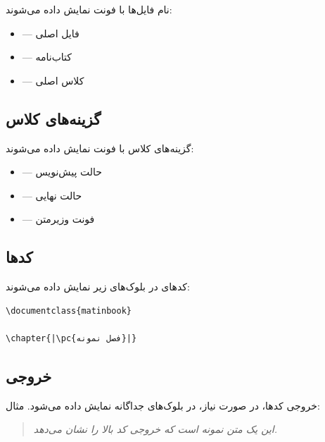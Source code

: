 نام فایل‌ها با فونت  نمایش داده
می‌شوند:

\begin{itemize}
    \item {} — فایل اصلی
    \item {} — کتاب‌نامه
    \item {} — کلاس اصلی
\end{itemize}

\subsection*{گزینه‌های کلاس}

گزینه‌های کلاس با فونت  نمایش داده
می‌شوند:

\begin{itemize}
    \item {} — حالت پیش‌نویس
    \item {} — حالت نهایی
    \item {} — فونت وزیرمتن
\end{itemize}

\subsection*{کدها}

کدهای  در بلوک‌های زیر نمایش داده
می‌شوند:

\begin{latin}
\begin{verbatim}
\documentclass{matinbook}

\chapter{|\pc{فصل نمونه}|}

\end{verbatim}
\end{latin}

\subsection*{خروجی}

خروجی کدها، در صورت نیاز، در بلوک‌های جداگانه
نمایش داده می‌شود. مثال:

\begin{quote}
    \itshape
    این یک متن نمونه است که خروجی کد بالا را
    نشان می‌دهد.
\end{quote}

